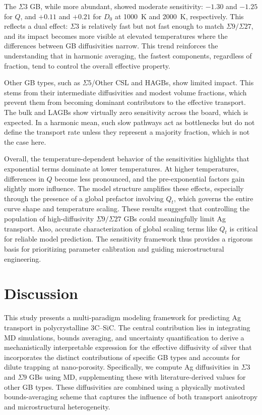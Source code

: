 \documentclass[%
preprint,
amsmath,amssymb,
aps,
]{revtex4-2}
\newcommand{\?}{\stackrel{?}{=}}
\begin{document}
The $\Sigma 3$ GB, while more abundant, showed moderate sensitivity: $-1.30$ and $-1.25$ for $Q$, and $+0.11$ and $+0.21$ for $D_0$ at 1000~K and 2000~K, respectively. This reflects a dual effect: $\Sigma 3$ is relatively fast but not fast enough to match $\Sigma 9/\Sigma 27$, and its impact becomes more visible at elevated temperatures where the differences between GB diffusivities narrow. This trend reinforces the understanding that in harmonic averaging, the fastest components, regardless of fraction, tend to control the overall effective property.

Other GB types, such as $\Sigma 5$/Other CSL and HAGBs, show limited impact. This stems from their intermediate diffusivities and modest volume fractions, which prevent them from becoming dominant contributors to the effective transport. The bulk and LAGBs show virtually zero sensitivity across the board, which is expected. In a harmonic mean, such slow pathways act as bottlenecks but do not define the transport rate unless they represent a majority fraction, which is not the case here.

Overall, the temperature-dependent behavior of the sensitivities highlights that exponential terms dominate at lower temperatures. At higher temperatures, differences in $Q$ become less pronounced, and the pre-exponential factors gain slightly more influence. The model structure amplifies these effects, especially through the presence of a global prefactor involving $Q_t$, which governs the entire curve shape and temperature scaling. These results suggest that controlling the population of high-diffusivity $\Sigma 9/\Sigma 27$ GBs could meaningfully limit Ag transport. Also, accurate characterization of global scaling terms like $Q_t$ is critical for reliable model prediction. The sensitivity framework thus provides a rigorous basis for prioritizing parameter calibration and guiding microstructural engineering.


\section{Discussion}

This study presents a multi-paradigm modeling framework for predicting Ag transport in polycrystalline 3C–SiC. The central contribution lies in integrating MD simulations, bounds averaging, and uncertainty quantification to derive a mechanistically interpretable expression for the effective diffusivity of silver that incorporates the distinct contributions of specific GB types and accounts for dilute trapping at nano-porosity. Specifically, we compute Ag diffusivities in $\Sigma 3$ and $\Sigma 9$ GBs using MD, supplementing these with literature-derived values for other GB types. These diffusivities are combined using a physically motivated bounds-averaging scheme that captures the influence of both transport anisotropy and microstructural heterogeneity.
\end{document}
